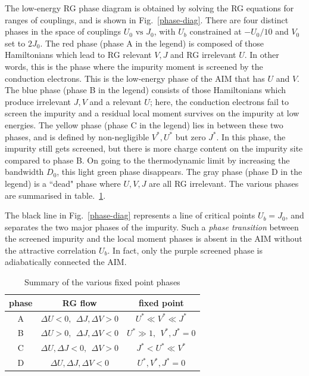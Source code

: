 \documentclass[reprint,superscriptaddress,floatfix]{revtex4-2}
\begin{document}
The low-energy RG phase diagram is obtained by solving the RG equations for ranges of couplings, and is shown in Fig.~\ref{phase-diag}. There are four distinct phases in the space of couplings \(U_0 \text{ vs } J_0\), with \(U_b\) constrained at \(-U_0/10\) and \(V_0\) set to \(2J_0\). The red phase (phase A in the legend) is composed of those Hamiltonians which lead to RG relevant \(V,J\) and RG irrelevant \(U\). In other words, this is the phase where the impurity moment is screened by the conduction electrons. This is the low-energy phase of the AIM that has \(U\) and \(V\). The blue phase (phase B in the legend) consists of those Hamiltonians which produce irrelevant \(J,V\) and a relevant \(U\); here, the conduction electrons fail to screen the impurity and a residual local moment survives on the impurity at low energies. The yellow phase (phase C in the legend) lies in between these two phases, and is defined by non-negligible \(V^*, U^*\) but zero \(J^*\). In this phase, the impurity still gets screened, but there is more charge content on the impurity site compared to phase B. On going to the thermodynamic limit by increasing the bandwidth \(D_0\), this light green phase disappears. The gray phase (phase D in the legend) is a ``dead" phase where \(U,V,J\) are all RG irrelevant. The various phases are summarised in table.~\ref{summary-phases}.

The black line in Fig.~\ref{phase-diag} represents a line of critical points \(U_b = J_0\), and separates the two major phases of the impurity. Such a {\it phase transition} between the screened impurity and the local moment phases is absent in the AIM without the attractive correlation \(U_b\). In fact, only the purple screened phase is adiabatically connected the AIM.

\begin{table}[!htb]
\centering
\begin{tabular}{|c|c|c|}
\hline
phase & RG flow & fixed point \\ 
\hline
A & \(\Delta U <0, ~ ~ \Delta J,\Delta V>0\) & \(U^* \ll V^* \ll J^*\) \\ 
B &  \(\Delta U > 0, ~ ~ \Delta J,\Delta V<0\) & \(U^* \gg 1, ~ ~V^*, J^* = 0\)\\
C &  \(\Delta U, \Delta J < 0,~ ~\Delta V>0\) & \(J^* < U^* \ll V^*\) \\
D &  \(\Delta U, \Delta J,\Delta V < 0\) & \(U^*, V^*, J^* = 0\) \\
\hline
\end{tabular}
\caption{Summary of the various fixed point phases}
\label{summary-phases}
\end{table}
\end{document}
